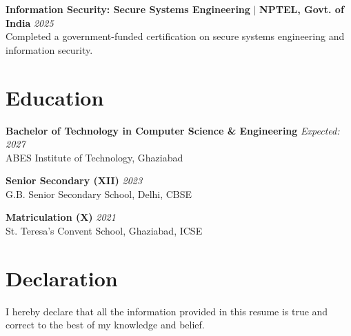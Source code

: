 \documentclass[10pt,a4paper]{article}
\begin{document}
\vspace{4pt}
\noindent\textbf{Information Security: Secure Systems Engineering} $|$ \textbf{NPTEL, Govt. of India} \hfill \textit{2025}\\
Completed a government-funded certification on secure systems engineering and information security.

\vspace{5pt}

\section*{Education}
\sectionrule

\noindent\textbf{Bachelor of Technology in Computer Science \& Engineering} \hfill \textit{Expected: 2027}\\
ABES Institute of Technology, Ghaziabad

\vspace{2pt}
\noindent\textbf{Senior Secondary (XII)} \hfill \textit{2023}\\
G.B. Senior Secondary School, Delhi, CBSE

\vspace{2pt}
\noindent\textbf{Matriculation (X)} \hfill \textit{2021}\\
St. Teresa's Convent School, Ghaziabad, ICSE

\section*{Declaration}
\sectionrule
\noindent I hereby declare that all the information provided in this resume is true and correct to the best of my knowledge and belief.
\end{document}
